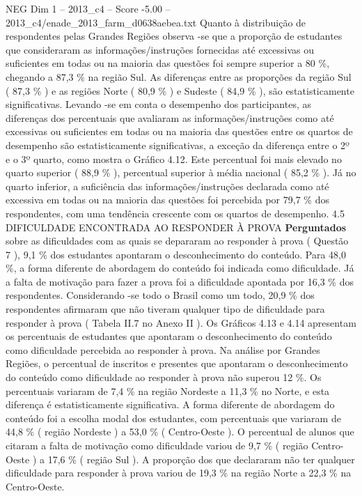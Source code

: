 \begin{textsample}{NEG Dim 1 – 2013\_c4 – Score -5.00 – 2013\_c4/enade\_2013\_farm\_d0638aebea.txt}
Quanto à distribuição de respondentes pelas Grandes Regiões observa -se que a proporção de estudantes que consideraram as informações/instruções fornecidas até excessivas ou suficientes em todas ou na maioria das questões foi sempre superior a 80 \%, chegando a 87,3 \% na região Sul.
As diferenças entre as proporções da região Sul ( 87,3 \% ) e as regiões Norte ( 80,9 \% ) e Sudeste ( 84,9 \% ), são estatisticamente significativas.
Levando -se em conta o desempenho dos participantes, as diferenças dos percentuais que avaliaram as informações/instruções como até excessivas ou suficientes em todas ou na maioria das questões entre os quartos de desempenho são estatisticamente significativas, a exceção da diferença entre o 2º e o 3º quarto, como mostra o Gráfico 4.12.
Este percentual foi mais elevado no quarto superior ( 88,9 \% ), percentual superior à média nacional ( 85,2 \% ).
Já no quarto inferior, a suficiência das informações/instruções declarada como até excessiva em todas ou na maioria das questões foi percebida por 79,7 \% dos respondentes, com uma tendência crescente com os quartos de desempenho. 4.5 DIFICULDADE ENCONTRADA AO RESPONDER À PROVA \textbf{Perguntados} sobre as dificuldades com as quais se depararam ao responder à prova ( Questão 7 ), 9,1 \% dos estudantes apontaram o desconhecimento do conteúdo.
Para 48,0 \%, a forma diferente de abordagem do conteúdo foi indicada como dificuldade.
Já a falta de motivação para fazer a prova foi a dificuldade apontada por 16,3 \% dos respondentes.
Considerando -se todo o Brasil como um todo, 20,9 \% dos respondentes afirmaram que não tiveram qualquer tipo de dificuldade para responder à prova ( Tabela II.7 no Anexo II ).
Os Gráficos 4.13 e 4.14 apresentam os percentuais de estudantes que apontaram o desconhecimento do conteúdo como dificuldade percebida ao responder à prova.
Na análise por Grandes Regiões, o percentual de inscritos e presentes que apontaram o desconhecimento do conteúdo como dificuldade ao responder à prova não superou 12 \%.
Os percentuais variaram de 7,4 \% na região Nordeste a 11,3 \% no Norte, e esta diferença é estatisticamente significativa.
A forma diferente de abordagem do conteúdo foi a escolha modal dos estudantes, com percentuais que variaram de 44,8 \% ( região Nordeste ) a 53,0 \% ( Centro-Oeste ).
O percentual de alunos que citaram a falta de motivação como dificuldade variou de 9,7 \% ( região Centro-Oeste ) a 17,6 \% ( região Sul ).
A proporção dos que declararam não ter qualquer dificuldade para responder à prova variou de 19,3 \% na região Norte a 22,3 \% na Centro-Oeste.

\end{textsample}

